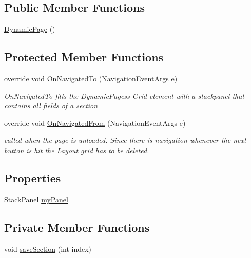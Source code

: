 \subsection*{Public Member Functions}
\begin{DoxyCompactItemize}
\item 
\hyperlink{class_listen_to_me_1_1_dynamic_page_aee4e65517f3b3f4bda37fec075ee0371}{Dynamic\+Page} ()
\end{DoxyCompactItemize}
\subsection*{Protected Member Functions}
\begin{DoxyCompactItemize}
\item 
override void \hyperlink{class_listen_to_me_1_1_dynamic_page_abe7cf843906f8a930d2bdd2ade17ea0b}{On\+Navigated\+To} (Navigation\+Event\+Args e)
\begin{DoxyCompactList}\small\item\em On\+Navigated\+To fills the Dynamic\+Pages\textquotesingle{}s Grid element with a stackpanel that contains all fields of a section \end{DoxyCompactList}\item 
override void \hyperlink{class_listen_to_me_1_1_dynamic_page_a042e3936e2668147cd280d2428ef793b}{On\+Navigated\+From} (Navigation\+Event\+Args e)
\begin{DoxyCompactList}\small\item\em called when the page is unloaded. Since there is navigation whenever the \textquotesingle{}next\textquotesingle{} button is hit the Layout grid has to be deleted. \end{DoxyCompactList}\end{DoxyCompactItemize}
\subsection*{Properties}
\begin{DoxyCompactItemize}
\item 
Stack\+Panel \hyperlink{class_listen_to_me_1_1_dynamic_page_a187c4aba2636c3956cf023f1dc3f86ec}{my\+Panel}
\end{DoxyCompactItemize}
\subsection*{Private Member Functions}
\begin{DoxyCompactItemize}
\item 
void \hyperlink{class_listen_to_me_1_1_dynamic_page_ab3716b91cf48530310b3cd6ce47506a3}{save\+Section} (int index)
\end{DoxyCompactItemize}


